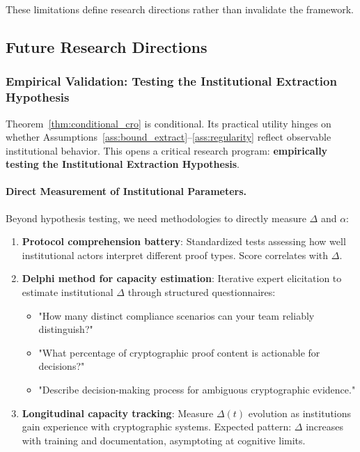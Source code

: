 \documentclass{ieeeaccess}
\begin{document}
These limitations define research directions rather than invalidate the framework.

\subsection{Future Research Directions}\label{subsec:future_directions}

\subsubsection{Empirical Validation: Testing the Institutional Extraction Hypothesis}

Theorem~\ref{thm:conditional_cro} is conditional. Its practical utility hinges on whether Assumptions~\ref{ass:bound_extract}--\ref{ass:regularity} reflect observable institutional behavior. This opens a critical research program: \textbf{empirically testing the Institutional Extraction Hypothesis}.

\paragraph{Direct Measurement of Institutional Parameters.}
Beyond hypothesis testing, we need methodologies to directly measure $\Delta$ and $\alpha$:

\begin{enumerate}
\item \textbf{Protocol comprehension battery}: Standardized tests assessing how well institutional actors interpret different proof types. Score correlates with $\Delta$.

\item \textbf{Delphi method for capacity estimation}: Iterative expert elicitation to estimate institutional $\Delta$ through structured questionnaires:
\begin{itemize}
\item "How many distinct compliance scenarios can your team reliably distinguish?"
\item "What percentage of cryptographic proof content is actionable for decisions?"
\item "Describe decision-making process for ambiguous cryptographic evidence."
\end{itemize}

\item \textbf{Longitudinal capacity tracking}: Measure $\Delta(t)$ evolution as institutions gain experience with cryptographic systems. Expected pattern: $\Delta$ increases with training and documentation, asymptoting at cognitive limits.
\end{enumerate}
\end{document}
